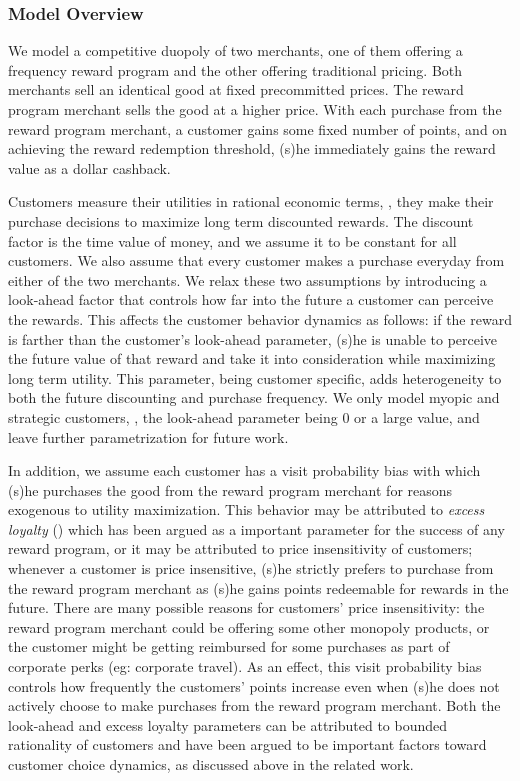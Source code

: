 \subsubsection{Model Overview}
We model a competitive duopoly of two merchants, one of them offering a frequency reward program and the other offering traditional pricing.
Both merchants sell an identical good at fixed precommitted prices.
The reward program merchant sells the good at a higher price.
With each purchase from the reward program merchant, a customer gains some fixed number of points, and on achieving the reward redemption threshold, (s)he immediately gains the reward value as a dollar cashback.

Customers measure their utilities in rational economic terms, \ie, they make their purchase decisions to maximize long term discounted rewards.
The discount factor is the time value of money, and we assume it to be constant for all customers.
We also assume that every customer makes a purchase everyday from either of the two merchants.
We relax these two assumptions by introducing a look-ahead factor that controls how far into the future a customer can perceive the rewards. 
This affects the customer behavior dynamics as follows: if the reward is farther than the customer's look-ahead parameter, (s)he is unable to perceive the future value of that reward and take it into consideration while maximizing long term utility.
This parameter, being customer specific, adds heterogeneity to both the future discounting and purchase frequency.
We only model myopic and strategic customers, \ie, the look-ahead parameter being $0$ or a large value, and leave further parametrization for future work.

In addition, we assume each customer has a visit probability bias with which (s)he purchases the good from the reward program merchant for reasons exogenous to utility maximization.
This behavior may be attributed to \emph{excess loyalty} (\cite{fader1993excess, sharp1997loyalty}) which has been argued as a important parameter for the success of any reward program, or it may be attributed to price insensitivity of customers; whenever a customer is price insensitive, (s)he strictly prefers to purchase from the reward program merchant as (s)he gains points redeemable for rewards in the future.
There are many possible reasons for customers' price insensitivity: the reward program merchant could be offering some other monopoly products, or the customer might be getting reimbursed for some purchases as part of corporate perks (eg: corporate travel).
As an effect, this visit probability bias controls how frequently the customers' points increase even when (s)he does not actively choose to make purchases from the reward program merchant.
Both the look-ahead and excess loyalty parameters can be attributed to bounded rationality of customers and have been argued to be important factors toward customer choice dynamics, as discussed above in the related work.


